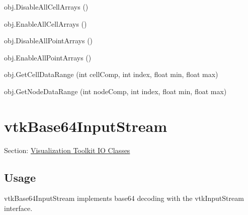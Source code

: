 \begin{DoxyItemize}
\item {\ttfamily obj.\-Disable\-All\-Cell\-Arrays ()}  
\item {\ttfamily obj.\-Enable\-All\-Cell\-Arrays ()}  
\item {\ttfamily obj.\-Disable\-All\-Point\-Arrays ()}  
\item {\ttfamily obj.\-Enable\-All\-Point\-Arrays ()}  
\item {\ttfamily obj.\-Get\-Cell\-Data\-Range (int cell\-Comp, int index, float min, float max)}  
\item {\ttfamily obj.\-Get\-Node\-Data\-Range (int node\-Comp, int index, float min, float max)}  
\end{DoxyItemize}\hypertarget{vtkio_vtkbase64inputstream}{}\section{vtk\-Base64\-Input\-Stream}\label{vtkio_vtkbase64inputstream}
Section\-: \hyperlink{sec_vtkio}{Visualization Toolkit I\-O Classes} \hypertarget{vtkwidgets_vtkxyplotwidget_Usage}{}\subsection{Usage}\label{vtkwidgets_vtkxyplotwidget_Usage}
vtk\-Base64\-Input\-Stream implements base64 decoding with the vtk\-Input\-Stream interface.

